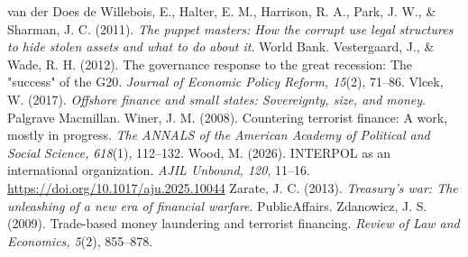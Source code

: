 \begin{referencelist}
   van der Does de Willebois, E., Halter, E. M., Harrison, R. A., Park, J. W., \& Sharman, J. C. (2011). \emph{The puppet masters: How the corrupt use legal structures to hide stolen assets and what to do about it}. World Bank.
   Vestergaard, J., \& Wade, R. H. (2012). The governance response to the great recession: The "success" of the G20. \emph{Journal of Economic Policy Reform, 15}(2), 71–86.
   Vlcek, W. (2017). \emph{Offshore finance and small states: Sovereignty, size, and money}. Palgrave Macmillan.
   Winer, J. M. (2008). Countering terrorist finance: A work, mostly in progress. \emph{The ANNALS of the American Academy of Political and Social Science, 618}(1), 112–132.
   Wood, M. (2026). INTERPOL as an international organization. \emph{AJIL Unbound, 120}, 11–16. \url{https://doi.org/10.1017/aju.2025.10044}
   Zarate, J. C. (2013). \emph{Treasury's war: The unleashing of a new era of financial warfare}. PublicAffairs.
   Zdanowicz, J. S. (2009). Trade-based money laundering and terrorist financing. \emph{Review of Law and Economics, 5}(2), 855–878.
\end{referencelist}
